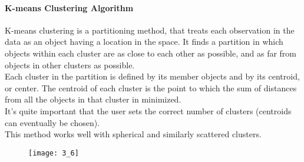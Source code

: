 \paragraph{K-means Clustering Algorithm}
K-means clustering is a partitioning method, that treats each observation in the data as an object having a location in the space. It finds a partition in which objects within each cluster are as close to each other as possible, and as far from objects in other clusters as possible.\\
Each cluster in the partition is defined by its member objects and by its centroid, or center. The centroid of each cluster is the point to which the sum of distances from all the objects in that cluster in minimized.\\
It's quite important that the user sets the correct number of clusters (centroids can eventually be chosen).\\
This method works well with spherical and similarly scattered clusters.
\begin{figure}[H]
    \texttt{[image: 3\_6]}
    \centering
\end{figure}
